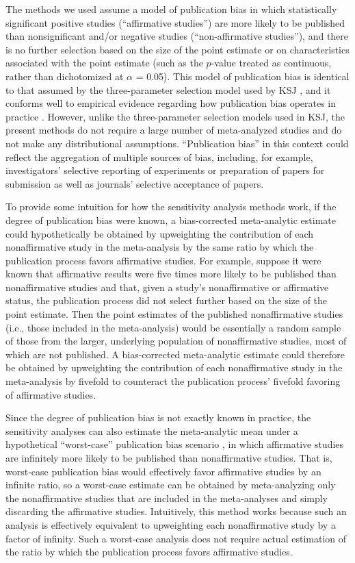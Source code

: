 \documentclass[man]{apa7}
\begin{document}
The methods we used assume a model of publication bias in which  statistically significant positive studies (``affirmative studies'') are more likely to be published than nonsignificant and/or negative studies (``non-affirmative studies''), and there is no further selection based on the size of the point estimate or on characteristics associated with the point estimate (such as the $p$-value treated as continuous, rather than dichotomized at $\alpha$ = 0.05). This model of publication bias is identical to that assumed by the three-parameter selection model used by KSJ \parencite{vevea1995general}, and it conforms well to empirical evidence regarding how publication bias operates in practice \parencite{mathur2019sensitivity}. However, unlike the three-parameter selection models used in KSJ, the present methods do not require a large number of meta-analyzed studies and do not make any distributional assumptions. ``Publication bias'' in this context could reflect the aggregation of multiple sources of bias, including, for example, investigators’ selective reporting of experiments or preparation of papers for submission as well as journals’ selective acceptance of papers. 

To provide some intuition for how the sensitivity analysis methods work, if the degree of publication bias were known, a bias-corrected meta-analytic estimate could hypothetically be obtained by upweighting the contribution of each nonaffirmative study in the meta-analysis by the same ratio by which the publication process favors affirmative studies. For example, suppose it were known that affirmative results were five times more likely to be published than nonaffirmative studies and that, given a study’s nonaffirmative or affirmative status, the publication process did not select further based on the size of the point estimate. Then the point estimates of the published nonaffirmative studies (i.e., those included in the meta-analysis) would be essentially a random sample of those from the larger, underlying population of nonaffirmative studies, most of which are not published. A bias-corrected meta-analytic estimate could therefore be obtained by upweighting the contribution of each nonaffirmative study in the meta-analysis by fivefold to counteract the publication process’ fivefold favoring of affirmative studies.

Since the degree of publication bias is not exactly known in practice, the sensitivity analyses can also estimate the meta-analytic mean under a hypothetical “worst-case” publication bias scenario \parencite{mathur2019sensitivity}, in which affirmative studies are infinitely more likely to be published than nonaffirmative studies.  That is, worst-case publication bias would effectively favor affirmative studies by an infinite ratio, so a worst-case estimate can be obtained by meta-analyzing only the nonaffirmative studies that are included in the meta-analyses and simply discarding the affirmative studies. Intuitively, this method works because such an analysis is effectively equivalent to upweighting each nonaffirmative study by a factor of infinity. Such a worst-case analysis does not require actual estimation of the ratio by which the publication process favors affirmative studies.
 
\end{document}
